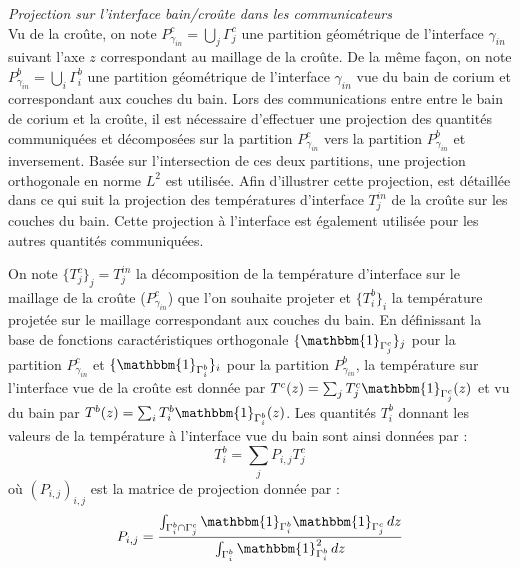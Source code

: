 {\it Projection sur l'interface bain/croûte dans les communicateurs}\\
Vu de la croûte, on note $P_{\gamma_{in}}^{c}=\displaystyle{\bigcup_j} \Gamma_j^c$ une partition géométrique de l'interface $\gamma_{in}$ suivant l'axe $z$ correspondant au maillage de la croûte. De la même façon, on note $P_{\gamma_{in}}^{b}=\displaystyle{\bigcup_i} \Gamma_i^b$ une partition géométrique de l'interface $\gamma_{in}$ vue du bain de corium et correspondant aux couches du bain. Lors des communications entre entre le bain de corium et la croûte, il est nécessaire d'effectuer une projection des quantités communiquées et décomposées sur la partition $P_{\gamma_{in}}^{c}$ vers la partition $P_{\gamma_{in}}^{b}$ et inversement. Basée sur l'intersection de ces deux partitions, une projection orthogonale en norme $L^2$ est utilisée. Afin d'illustrer cette projection, est détaillée dans ce qui suit la projection des températures d'interface $T_j^{in}$ de la croûte sur les couches du bain. Cette projection à l'interface est également utilisée pour les autres quantités communiquées.

On note $\{T_j^c\}_j=T_j^{in}$ la décomposition de la température d'interface sur le maillage de la croûte ($P_{\gamma_{in}}^{c}$) que l'on souhaite projeter et $\{T_i^b\}_i$ la température projetée sur le maillage correspondant aux couches du bain.
En définissant la base de fonctions caractéristiques orthogonale $\{{\mathbbm{1}}_{\Gamma_j^c}\}_j$ pour la partition $P_{\gamma_{in}}^{c}$ et  $\{{\mathbbm{1}}_{\Gamma_i^b}\}_i$ pour la partition $P_{\gamma{_{in}}}^{b}$, la température sur l'interface vue de la croûte est donnée par $T^c(z)=\sum_j {T_j^c {\mathbbm{1}}_{\Gamma_j^c}(z)}$ et vu du bain par  $T^b(z)=\sum_i {T_i^b {\mathbbm{1}}_{\Gamma_i^b}(z)}$.
Les quantités $T_i^b$ donnant les valeurs de la température à l'interface vue du bain sont ainsi données par : $$T_i^b=\sum_j P_{i,j} T_j^c$$ où $\left(P_{i,j}\right)_{i,j}$ est la matrice de projection donnée par : $$P_{i,j}=\frac{\int_{\Gamma_i^b\cap\Gamma_j^c}{\mathbbm{1}}_{\Gamma_i^b}{\mathbbm{1}}_{\Gamma_j^c}\, dz}{ \int_{\Gamma_i^b}{\mathbbm{1}}_{\Gamma_i^b}^2\, dz}$$

